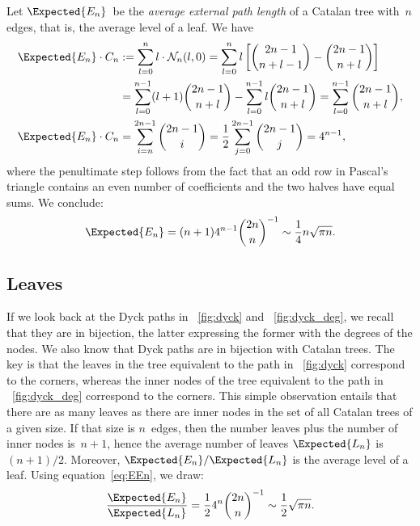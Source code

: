 Let \(\Expected{E_n}\)~be the \emph{average external path length} of a
Catalan tree with~\(n\) edges, that is, the average level of a
leaf. We have
\begin{align*}
\Expected{E_n} \cdot C_n
  &:= \sum_{l=0}^{n} l \cdot \mathcal{N}_n(l,0)
   = \sum_{l=0}^{n}l\left[\binom{2n-1}{n+l-1} -
     \binom{2n-1}{n+l}\right]\\
  &= \sum_{l=0}^{n-1}(l+1)\binom{2n-1}{n+l} -
     \sum_{l=0}^{n-1}l \binom{2n-1}{n+l}
   = \sum_{l=0}^{n-1}\binom{2n-1}{n+l},\\
\Expected{E_n} \cdot C_n
  &= \sum_{i=n}^{2n-1}\binom{2n-1}{i}
   = \frac{1}{2}\sum_{j=0}^{2n-1}\binom{2n-1}{j} = 4^{n-1},
\end{align*}
where the penultimate step follows from the fact that an odd row in
Pascal's triangle contains an even number of coefficients and the two
halves have equal sums. We conclude:
\begin{equation}
\Expected{E_n} = (n+1) 4^{n-1}\binom{2n}{n}^{-1} \sim
\frac{1}{4}n\sqrt{\pi n}.
\label{eq:EEn}
\end{equation}

\subsection*{Leaves}

If we look back at the Dyck paths in \fig~\ref{fig:dyck} and
\fig~\ref{fig:dyck_deg}, we recall that they are in bijection, the
latter expressing the former with the degrees of the nodes. We also
know that Dyck paths are in bijection with Catalan trees. The key is
that the leaves in the tree equivalent to the path in
\fig~\ref{fig:dyck} correspond to the corners, whereas the inner nodes
of the tree equivalent to the path in \fig~\ref{fig:dyck_deg}
correspond to the corners. This simple observation entails that there
are as many leaves as there are inner nodes in the set of all Catalan
trees of a given size. If that size is \(n\)~edges, then the number
leaves plus the number of inner nodes is~\(n+1\), hence the average
number of leaves \(\Expected{L_n}\) is \((n+1)/2\). Moreover,
\(\Expected{E_n}/\Expected{L_n}\) is the average level of a
leaf. Using equation~\eqref{eq:EEn}, we draw:
\begin{equation*}
\frac{\Expected{E_n}}{\Expected{L_n}} =
\frac{1}{2}4^n\binom{2n}{n}^{-1} \sim \frac{1}{2}\sqrt{\pi n}.
\end{equation*}
